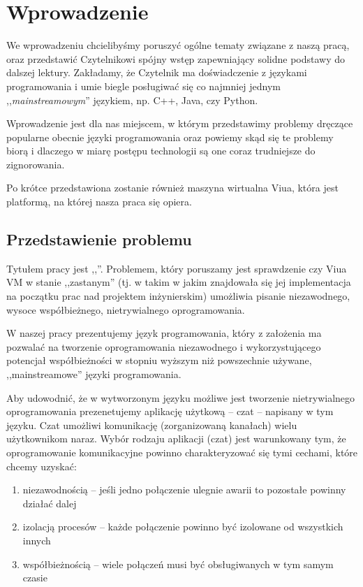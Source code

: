\chapter{Wprowadzenie}
\label{wprowadzenie}

We wprowadzeniu chcielibyśmy poruszyć ogólne tematy związane z naszą pracą, oraz przedstawić Czytelnikowi
spójny wstęp zapewniający solidne podstawy do dalszej lektury. Zakładamy, że Czytelnik ma doświadczenie z
językami programowania i umie biegle posługiwać się co najmniej jednym ,,\emph{mainstreamowym}'' językiem, np.
C++, Java, czy Python.

Wprowadzenie jest dla nas miejscem, w którym przedstawimy problemy dręczące popularne obecnie języki
programowania oraz powiemy skąd się te problemy biorą i dlaczego w miarę postępu technologii są one coraz
trudniejsze do zignorowania.

Po krótce przedstawiona zostanie również maszyna wirtualna Viua, która jest platformą, na której nasza praca
się opiera.

\section{Przedstawienie problemu}

Tytułem pracy jest ,,\inzmaintitlePL''. Problemem, który poruszamy jest sprawdzenie czy Viua VM w stanie
,,zastanym'' (tj. w takim w jakim znajdowała się jej implementacja na początku prac nad projektem
inżynierskim) umożliwia pisanie niezawodnego, wysoce współbieżnego, nietrywialnego oprogramowania.

W naszej pracy prezentujemy język programowania, który z założenia ma pozwalać na tworzenie oprogramowania
niezawodnego i wykorzystującego potencjał współbieżności w stopniu wyższym niż powszechnie używane,
,,mainstreamowe'' języki programowania.

Aby udowodnić, że w wytworzonym języku możliwe jest tworzenie nietrywialnego oprogramowania prezenetujemy
aplikację użytkową -- czat -- napisany w tym języku. Czat umożliwi komunikację (zorganizowaną kanałach) wielu
użytkownikom naraz. Wybór rodzaju aplikacji (czat) jest warunkowany tym, że oprogramowanie komunikacyjne
powinno charakteryzować się tymi cechami, które chcemy uzyskać:

\begin{enumerate}
    \item niezawodnością -- jeśli jedno połączenie ulegnie awarii to pozostałe powinny działać dalej
    \item izolacją procesów -- każde połączenie powinno być izolowane od wszystkich innych
    \item współbieżnością -- wiele połączeń musi być obsługiwanych w tym samym czasie
\end{enumerate}

